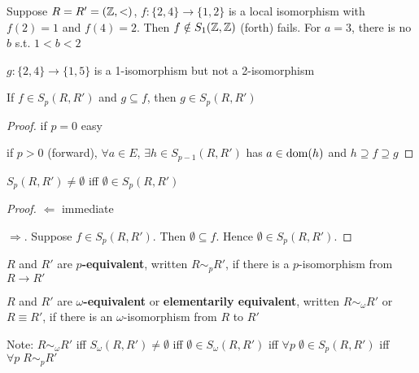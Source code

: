 \documentclass[11pt]{article}
\begin{document}
\begin{examplle}[]
Suppose \(R=R'=(\mathbb{Z},<)\), \(f:\{2,4\}\to\{1,2\}\) is a local isomorphism with \(f(2)=1\) and \(f(4)=2\).
Then \(f\notin S_1(\mathbb{Z},\mathbb{Z})\) (forth) fails. For \(a=3\), there is no \(b\) s.t. \(1<b<2\)

\(g:\{2,4\}\to\{1,5\}\) is a 1-isomorphism but not a 2-isomorphism
\end{examplle}

\begin{proposition}[]
If \(f\in S_p(R,R')\) and \(g\subseteq f\), then \(g\in S_p(R,R')\)
\end{proposition}

\begin{proof}
if \(p=0\) easy

if \(p>0\) (forward), \(\forall a\in E\), \(\exists h\in S_{p-1}(R,R')\) has \(a\in\operatorname{dom}(h)\) and \(h\supseteq f\supseteq g\)
\end{proof}

\begin{proposition}[]
\(S_p(R,R')\neq\emptyset\) iff \(\emptyset\in S_p(R,R')\)
\end{proposition}

\begin{proof}
\(\Leftarrow\) immediate

\(\Rightarrow\). Suppose \(f\in S_p(R,R')\). Then \(\emptyset\subseteq f\). Hence \(\emptyset\in S_p(R,R')\).
\end{proof}

\begin{definition}[]
\(R\) and \(R'\) are \textbf{\(p\)-equivalent}, written \(R\sim_p R'\), if there is a \(p\)-isomorphism
from \(R\to R'\)
\end{definition}

\(R\) and \(R'\) are \textbf{\(\omega\)-equivalent} or \textbf{elementarily equivalent}, written \(R\sim_\omega R'\)
or \(R\equiv R'\), if there is an \(\omega\)-isomorphism from \(R\) to \(R'\)

Note: \(R\sim_\omega R'\) iff \(S_\omega(R,R')\neq\emptyset\) iff \(\emptyset\in S_\omega(R,R')\) iff \(\forall p\;\emptyset\in S_p(R,R')\)
iff \(\forall p\; R\sim_pR'\)
\end{document}
